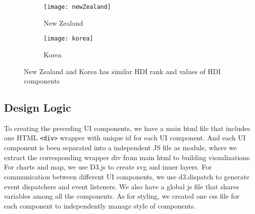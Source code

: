 \begin{itemize}
    \begin{figure}[h!]
    	\centering
    	\begin{subfigure}[b]{0.4\linewidth}
    		\texttt{[image: newZealand]}
    		\caption{New Zealand}
    	\end{subfigure}
    	\begin{subfigure}[b]{0.4\linewidth}
    		\texttt{[image: korea]}
    		\caption{Korea}
    	\end{subfigure}
    	\caption{New Zealand and Korea has similar HDI rank and values of HDI components}
    	\label{fig:panel}
    \end{figure}
\end{itemize}

\subsection{Design Logic}
To creating the preceding UI components, we have a main html file that includes one HTML \texttt{<div>} wrapper with unique id for each UI component. And each UI component is been separated into a independent JS file as module, where we extract the corresponding wrapper div from main html to building visualizations. For charts and map, we use D3.js to create svg and inner layers. For communication between different UI components, we use d3.dispatch to generate event dispatchers and event listeners.  We also have a global js file that shares variables among all the components. As for styling, we created one css file for each component to independently manage style of components.
